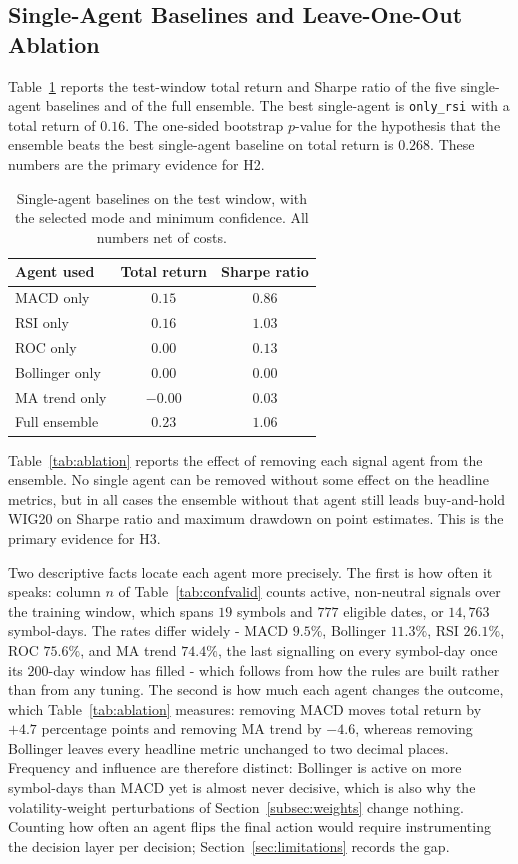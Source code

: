 \documentclass{ieeeaccess}
\newcommand{\TRtest}{\ensuremath{0.23}}
\newcommand{\Shtest}{\ensuremath{1.06}}
\newcommand{\BestSingleName}{\texttt{only\_rsi}}
\newcommand{\BestSingleTR}{\ensuremath{0.16}}
\newcommand{\PvsBestSingle}{\ensuremath{0.268}}
\begin{document}
\subsection{Single-Agent Baselines and Leave-One-Out Ablation}
\label{subsec:ablation}

Table~\ref{tab:single_agent} reports the test-window total return and Sharpe ratio of the five single-agent baselines and of the full ensemble. The best single-agent is \BestSingleName{} with a total return of \BestSingleTR{}. The one-sided bootstrap $p$-value for the hypothesis that the ensemble beats the best single-agent baseline on total return is \PvsBestSingle{}. These numbers are the primary evidence for H2.

\begin{table}[t]
\centering
\caption{Single-agent baselines on the test window, with the selected mode and minimum confidence. All numbers net of costs.}
\label{tab:single_agent}
\begin{tabular}{lcc}
\toprule
Agent used & Total return & Sharpe ratio \\
\midrule
MACD only        & $0.15$ & $0.86$ \\
RSI only         & $0.16$ & $1.03$ \\
ROC only         & $0.00$ & $0.13$ \\
Bollinger only   & $0.00$ & $0.00$ \\
MA trend only    & $-0.00$ & $0.03$ \\
Full ensemble    & $\TRtest$ & $\Shtest$ \\
\bottomrule
\end{tabular}
\end{table}

Table~\ref{tab:ablation} reports the effect of removing each signal agent from the ensemble. No single agent can be removed without some effect on the headline metrics, but in all cases the ensemble without that agent still leads buy-and-hold WIG20 on Sharpe ratio and maximum drawdown on point estimates. This is the primary evidence for H3.

Two descriptive facts locate each agent more precisely. The first is how often it speaks: column $n$ of Table~\ref{tab:confvalid} counts active, non-neutral signals over the training window, which spans $19$ symbols and $777$ eligible dates, or $14{,}763$ symbol-days. The rates differ widely - MACD $9.5\%$, Bollinger $11.3\%$, RSI $26.1\%$, ROC $75.6\%$, and MA trend $74.4\%$, the last signalling on every symbol-day once its $200$-day window has filled - which follows from how the rules are built rather than from any tuning. The second is how much each agent changes the outcome, which Table~\ref{tab:ablation} measures: removing MACD moves total return by $+4.7$ percentage points and removing MA trend by $-4.6$, whereas removing Bollinger leaves every headline metric unchanged to two decimal places. Frequency and influence are therefore distinct: Bollinger is active on more symbol-days than MACD yet is almost never decisive, which is also why the volatility-weight perturbations of Section~\ref{subsec:weights} change nothing. Counting how often an agent flips the final action would require instrumenting the decision layer per decision; Section~\ref{sec:limitations} records the gap.
\end{document}
